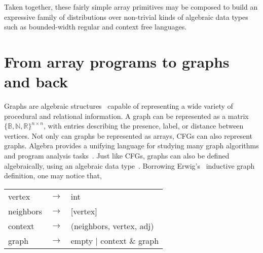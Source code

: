 \documentclass[sigplan,10pt,review,anonymous]{acmart}
\begin{document}
Taken together, these fairly simple array primitives may be composed to build an expressive family of distributions over non-trivial kinds of algebraic data types such as bounded-width regular and context free languages.



%

\section{From array programs to graphs and back}\label{sec:graphs}

Graphs are algebraic structures~\cite{weisfeiler1968reduction} capable of representing a wide variety of procedural and relational information. A graph can be represented as a matrix $\{\mathbb{B}, \mathbb{N}, \mathbb{R}\}^{n\times n}$, with entries describing the presence, label, or distance between vertices. Not only can graphs be represented as arrays, CFGs can also represent graphs. Algebra provides a unifying language for studying many graph algorithms and program analysis tasks~\citep{kepner2011graph}. Just like CFGs, graphs can also be defined algebraically, using an algebraic data type~\cite{mokhov2017algebraic}. Borrowing Erwig's~\citep{erwig2001inductive} inductive graph definition, one may notice that,

  \begin{table}[H]
    \begin{tabular}{lcl}
      vertex  & $\rightarrow$ & int \\
      neighbors & $\rightarrow$ & [vertex] \\
      context & $\rightarrow$ & (neighbors, vertex, adj) \\
      graph   & $\rightarrow$ & empty | context \& graph \\
    \end{tabular}
  \end{table}
\end{document}

